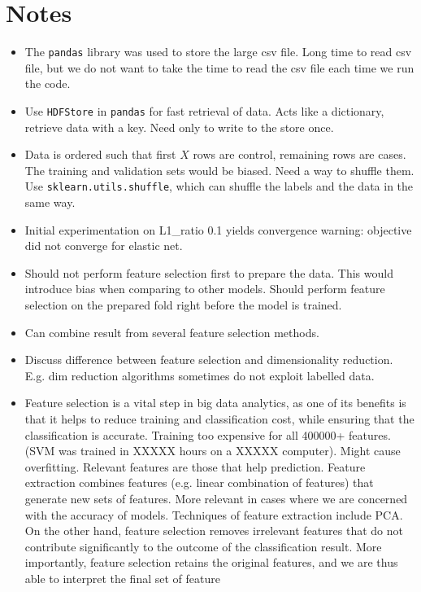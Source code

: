 \documentclass[12pt, twoside, a4paper]{article}
\begin{document}
\section{Notes}
\begin{itemize}
    \item The \texttt{pandas} library was used to store the large csv file. Long time to read csv file, but we do not want to take the time to read the csv file each time we run the code.
    
    \item Use \texttt{HDFStore} in \texttt{pandas} for fast retrieval of data. Acts like a dictionary, retrieve data with a key. Need only to write to the store once.
    
    \item Data is ordered such that first $X$ rows are control, remaining rows are cases. The training and validation sets would be biased. Need a way to shuffle them. Use \texttt{sklearn.utils.shuffle}, which can shuffle the labels and the data in the same way.
    
    \item Initial experimentation on L1\_ratio 0.1 yields convergence warning: objective did not converge for elastic net.
    
    \item Should not perform feature selection first to prepare the data. This would introduce bias when comparing to other models. Should perform feature selection on the prepared fold right before the model is trained.
    
    \item Can combine result from several feature selection methods.
    
    \item Discuss difference between feature selection and dimensionality reduction. E.g. dim reduction algorithms sometimes do not exploit labelled data.
    
    \item Feature selection is a vital step in big data analytics, as one of its benefits is that it helps to reduce training and classification cost, while ensuring that the classification is accurate.  Training too expensive for all 400000+ features. (SVM was trained in XXXXX hours on a XXXXX computer). Might cause overfitting. Relevant features are those that help prediction. Feature extraction combines features (e.g. linear combination of features) that generate new sets of features. More relevant in cases where we are concerned with the accuracy of models. Techniques of feature extraction include PCA. On the other hand, feature selection removes irrelevant features that do not contribute significantly to the outcome of the classification result. More importantly, feature selection retains the original features, and we are thus able to interpret the final set of feature \cite{RefWorks:163}
    

\end{itemize}
\end{document}
